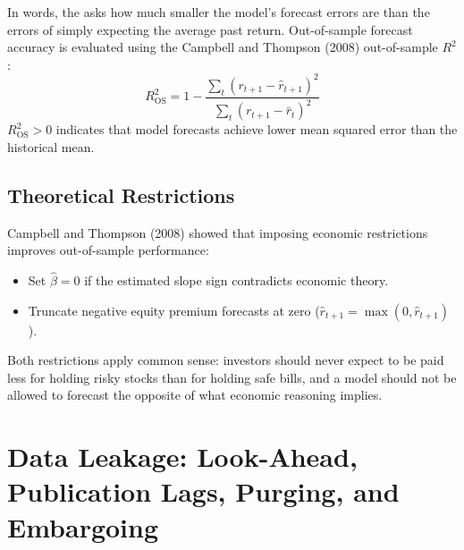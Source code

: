 In words, the  asks how much smaller the model's forecast errors are than the errors of simply expecting the average past return. Out-of-sample forecast accuracy is evaluated using the Campbell and Thompson (2008) out-of-sample $R^2$:
\begin{equation}
  R^2_{\text{OS}} = 1 - \frac{\sum_{t} \left( r_{t+1} - \hat{r}_{t+1} \right)^2}{\sum_{t} \left( r_{t+1} - \bar{r}_t \right)^2}
  \label{eq:09-r2os}
\end{equation}
$R^2_{\text{OS}} > 0$ indicates that model forecasts achieve lower mean squared error than the historical mean.

\subsection{Theoretical Restrictions}
Campbell and Thompson (2008) showed that imposing economic restrictions improves out-of-sample performance:
\begin{itemize}
  \item Set $\hat{\beta} = 0$ if the estimated slope sign contradicts economic theory.
  \item Truncate negative equity premium forecasts at zero ($\hat{r}_{t+1} = \max(0, \hat{r}_{t+1})$).
\end{itemize}
Both restrictions apply common sense: investors should never expect to be paid less for holding risky stocks than for holding safe bills, and a model should not be allowed to forecast the opposite of what economic reasoning implies.


\section{Data Leakage: Look-Ahead, Publication Lags, Purging, and Embargoing}
\label{sec:09-leakage}

